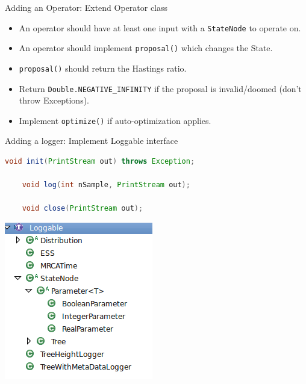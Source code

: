 \documentclass{beamer}
\theoremstyle{definition}
\begin{document}
\begin{frame}[containsverbatim]{Adding an Operator: Extend Operator class}

\begin{itemize}
\item An operator should have at least one input with a {\tt StateNode} to operate on.
\item An operator should implement {\tt proposal()} which changes the State.
\item {\tt proposal()} should return the Hastings ratio.
\item Return {\tt Double.NEGATIVE\_INFINITY} if the proposal is invalid/doomed
(don't throw Exceptions).
\item Implement {\tt optimize()} if auto-optimization applies.
\end{itemize}


\end{frame}


\begin{frame}[containsverbatim]{Adding a logger: Implement Loggable interface}

\begin{lstlisting}[language=java]
    void init(PrintStream out) throws Exception;

    void log(int nSample, PrintStream out);

    void close(PrintStream out);
\end{lstlisting}

\includegraphics[widht=0.5\textwidth]{loggables.png}

\end{frame}
\end{document}
